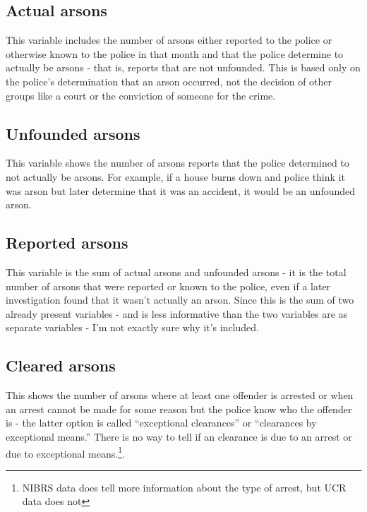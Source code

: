 \documentclass[
  12pt,
  openany]{book}
\begin{document}
\hypertarget{actual-arsons}{%
\subsection{Actual arsons}\label{actual-arsons}}

This variable includes the number of arsons either reported to the police or otherwise known to the police in that month and that the police determine to actually be arsons - that is, reports that are not unfounded. This is based only on the police's determination that an arson occurred, not the decision of other groups like a court or the conviction of someone for the crime.

\hypertarget{unfounded-arsons}{%
\subsection{Unfounded arsons}\label{unfounded-arsons}}

This variable shows the number of arsons reports that the police determined to not actually be arsons. For example, if a house burns down and police think it was arson but later determine that it was an accident, it would be an unfounded arson.

\hypertarget{reported-arsons}{%
\subsection{Reported arsons}\label{reported-arsons}}

This variable is the sum of actual arsons and unfounded arsons - it is the total number of arsons that were reported or known to the police, even if a later investigation found that it wasn't actually an arson. Since this is the sum of two already present variables - and is less informative than the two variables are as separate variables - I'm not exactly sure why it's included.

\hypertarget{cleared-arsons}{%
\subsection{Cleared arsons}\label{cleared-arsons}}

This shows the number of arsons where at least one offender is arrested or when an arrest cannot be made for some reason but the police know who the offender is - the latter option is called ``exceptional clearances'' or ``clearances by exceptional means.'' There is no way to tell if an clearance is due to an arrest or due to exceptional means.\footnote{NIBRS data does tell more information about the type of arrest, but UCR data does not}.
\end{document}
